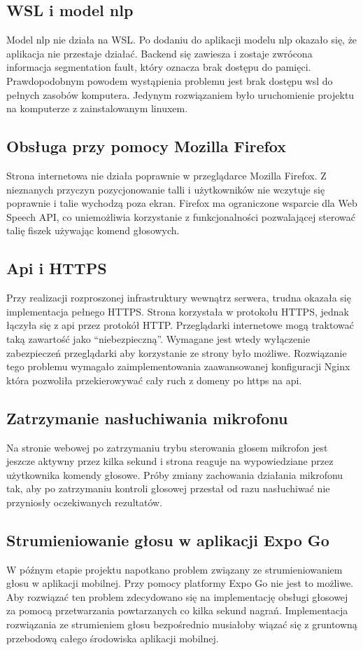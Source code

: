 \subsection{WSL i model nlp}
Model nlp nie działa na WSL. Po dodaniu do aplikacji modelu nlp okazało się, że aplikacja nie przestaje działać. Backend się zawiesza i zostaje zwrócona informacja segmentation fault, który oznacza brak dostępu do pamięci. Prawdopodobnym powodem wystąpienia problemu jest brak dostępu wsl do pełnych zasobów komputera. Jedynym rozwiązaniem było uruchomienie projektu na komputerze z zainstalowanym linuxem.

\subsection{Obsługa przy pomocy Mozilla Firefox}
Strona internetowa nie działa poprawnie w przeglądarce Mozilla Firefox. Z nieznanych przyczyn pozycjonowanie talli i użytkowników nie wczytuje się poprawnie i talie wychodzą poza ekran. Firefox ma ograniczone wsparcie dla Web Speech API,  co uniemożliwia korzystanie z funkcjonalności pozwalającej sterować talię fiszek używając komend głosowych.

\subsection{Api i HTTPS}
Przy realizacji rozproszonej infrastruktury wewnątrz serwera, trudna okazała się implementacja pełnego HTTPS. Strona korzystała w protokołu HTTPS, jednak łączyła się z api przez protokół HTTP. Przeglądarki internetowe mogą traktować taką zawartość jako “niebezpieczną”. Wymagane jest wtedy wyłączenie zabezpieczeń przeglądarki aby korzystanie ze strony było możliwe. Rozwiązanie tego problemu wymagało zaimplementowania zaawansowanej konfiguracji Nginx która pozwoliła przekierowywać cały ruch z domeny po https na api.

\subsection{Zatrzymanie nasłuchiwania mikrofonu}
Na stronie webowej po zatrzymaniu trybu sterowania głosem mikrofon jest jeszcze aktywny przez kilka sekund i strona reaguje na wypowiedziane przez użytkownika komendy głosowe. Próby zmiany zachowania działania mikrofonu tak, aby po zatrzymaniu kontroli głosowej przestał od razu nasłuchiwać nie przyniosły oczekiwanych rezultatów.

\subsection{Strumieniowanie głosu w aplikacji Expo Go}
W późnym etapie projektu napotkano problem związany ze strumieniowaniem głosu w aplikacji mobilnej. Przy pomocy platformy Expo Go nie jest to możliwe. Aby rozwiązać ten problem zdecydowano się na implementację obsługi głosowej za pomocą przetwarzania powtarzanych co kilka sekund nagrań. Implementacja rozwiązania ze strumieniem głosu bezpośrednio musiałoby wiązać się z gruntowną przebodową całego środowiska aplikacji mobilnej.

